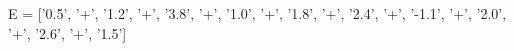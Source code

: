 \documentclass[preview]{standalone}
\begin{document}
\begin{center}
E = ['0.5', '+', '1.2', '+', '3.8', '+', '1.0', '+', '1.8', '+', '2.4', '+', '-1.1', '+', '2.0', '+', '2.6', '+', '1.5']
\end{center}
\end{document}

